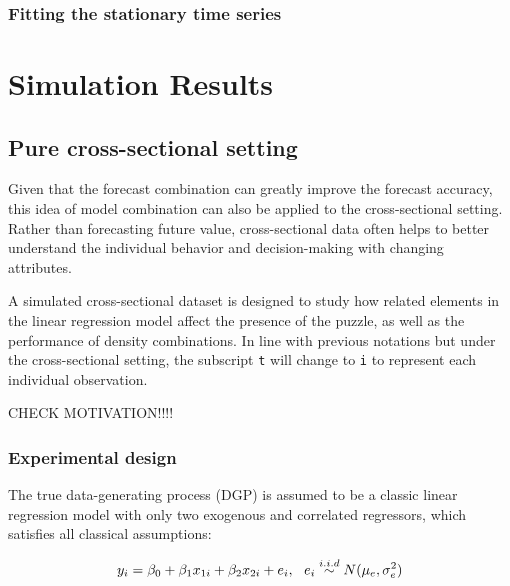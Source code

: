 \documentclass{monashthesis}
\begin{document}
\hypertarget{fitting-the-stationary-time-series}{%
\subsection{Fitting the stationary time series}\label{fitting-the-stationary-time-series}}

\hypertarget{simulation-results}{%
\chapter{Simulation Results}\label{simulation-results}}

\hypertarget{pure-cross-sectional-setting}{%
\section{Pure cross-sectional setting}\label{pure-cross-sectional-setting}}

Given that the forecast combination can greatly improve the forecast accuracy, this idea of model combination can also be applied to the cross-sectional setting. Rather than forecasting future value, cross-sectional data often helps to better understand the individual behavior and decision-making with changing attributes.

A simulated cross-sectional dataset is designed to study how related elements in the linear regression model affect the presence of the puzzle, as well as the performance of density combinations. In line with previous notations but under the cross-sectional setting, the subscript \texttt{t} will change to \texttt{i} to represent each individual observation.

CHECK MOTIVATION!!!!

\hypertarget{experimental-design}{%
\subsection{Experimental design}\label{experimental-design}}

The true data-generating process (DGP) is assumed to be a classic linear regression model with only two exogenous and correlated regressors, which satisfies all classical assumptions:

\begin{equation}
\label{eqn:DGP}
y_i = \beta_0 + \beta_1 x_{1i} + \beta_2 x_{2i} + e_i, \ \ e_i \stackrel{i.i.d}{\sim} N(\mu_e,\sigma^2_e) \\
\end{equation}
\end{document}
